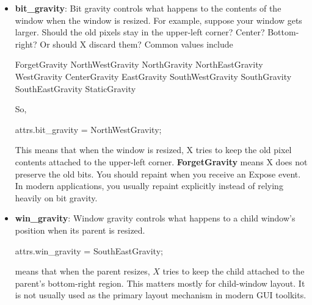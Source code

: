 \documentclass{report}
\begin{document}
\begin{itemize}
\begin{itemize}
                \item \textbf{bit\_gravity}: Bit gravity controls what happens to the contents of the window when the window is resized.
                    \bigbreak \noindent 
                    For example, suppose your window gets larger. Should the old pixels stay in the upper-left corner? Center? Bottom-right? Or should X discard them?
                    \bigbreak \noindent 
                    Common values include
                    \bigbreak \noindent 
                    \begin{cppcode}
                        ForgetGravity
                        NorthWestGravity
                        NorthGravity
                        NorthEastGravity
                        WestGravity
                        CenterGravity
                        EastGravity
                        SouthWestGravity
                        SouthGravity
                        SouthEastGravity
                        StaticGravity
                    \end{cppcode}
                    \bigbreak \noindent 
                    So,
                    \bigbreak \noindent 
                    \begin{cppcode}
                    attrs.bit_gravity = NorthWestGravity;
                    \end{cppcode}
                    \bigbreak \noindent 
                    This means that when the window is resized, X tries to keep the old pixel contents attached to the upper-left corner.
                    \bigbreak \noindent 
                    \textbf{ForgetGravity} means X does not preserve the old bits. You should repaint when you receive an Expose event.
                    \bigbreak \noindent 
                    In modern applications, you usually repaint explicitly instead of relying heavily on bit gravity.
                \item \textbf{win\_gravity}: Window gravity controls what happens to a child window’s position when its parent is resized.
                    \bigbreak \noindent 
                    \begin{cppcode}
                    attrs.win_gravity = SouthEastGravity;
                    \end{cppcode}
                    \bigbreak \noindent 
                    means that when the parent resizes, $X$ tries to keep the child attached to the parent’s bottom-right region.
                    \bigbreak \noindent 
                    This matters mostly for child-window layout. It is not usually used as the primary layout mechanism in modern GUI toolkits.

\end{itemize}
\end{itemize}
\end{document}
